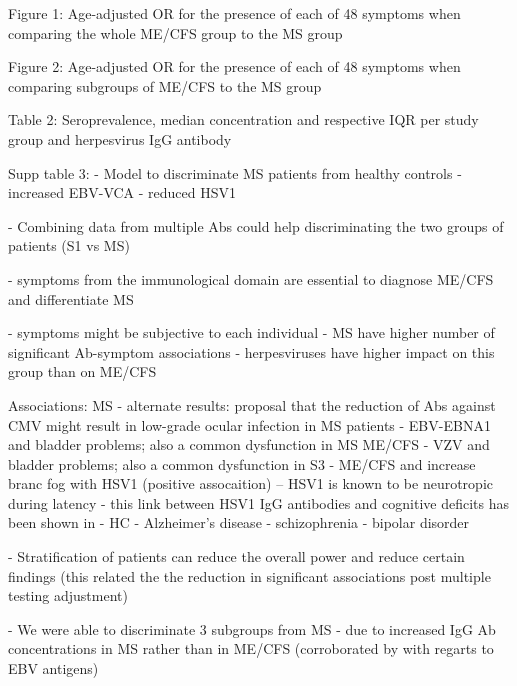 Figure 1: Age-adjusted OR for the presence of each of 48 symptoms when comparing the whole ME/CFS group to the MS group

Figure 2: Age-adjusted OR for the presence of each of 48 symptoms when comparing subgroups of ME/CFS to the MS group


Table 2: Seroprevalence, median concentration and respective IQR per study group and herpesvirus IgG antibody

Supp table 3:
- Model to discriminate MS patients from healthy controls
    - increased EBV-VCA
    - reduced HSV1

- Combining data from multiple Abs could help discriminating the two groups of patients (S1 vs MS)


- symptoms from the immunological domain are essential to diagnose ME/CFS and differentiate MS

- symptoms might be subjective to each individual
- MS have higher number of significant Ab-symptom associations
    - herpesviruses have higher impact on this group than on ME/CFS

Associations:
MS
    - alternate results: proposal that the reduction of Abs against CMV might result in low-grade ocular infection in MS patients
    - EBV-EBNA1 and bladder problems; also a common dysfunction in MS
ME/CFS
    - VZV and bladder problems; also a common dysfunction in S3
    - ME/CFS and increase branc fog with HSV1 (positive assocaition) -- HSV1 is known to be neurotropic during latency \citep{marcocci2020HerpesSimplex}
        - this link between HSV1 IgG antibodies and cognitive deficits has been shown in
                - HC \citep{fruchter2015ImpactHerpes, jonker2014AssociationExposure, tarter2014PersistentViral}
                - Alzheimer's disease \citep{murphy2021HerpesSimplex}
                - schizophrenia \citep{dickerson2020AssociationExposure}
                - bipolar disorder \citep{tucker2019AssessmentCognitive}

- Stratification of patients can reduce the overall power and reduce certain findings (this related the the reduction in significant associations post multiple testing adjustment)

- We were able to discriminate 3 subgroups from MS
    - due to increased IgG Ab concentrations in MS rather than in ME/CFS (corroborated by \citet{loebel2017SerologicalProfiling} with regarts to EBV antigens)

